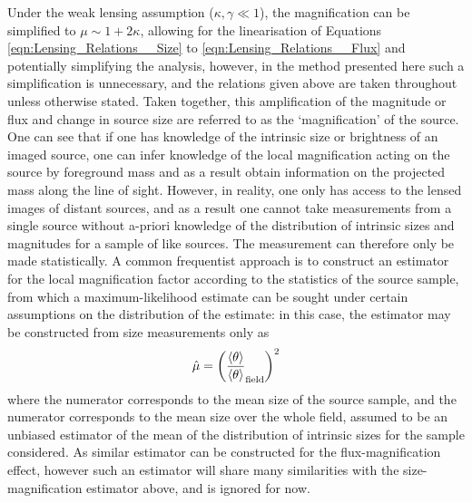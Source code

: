 \documentclass[useAMS,usenatbib,times,letter,amssymb]{mn2e}
\def\be{\begin{equation}}
\def\ee{\end{equation}}
\begin{document}
Under the weak lensing assumption ($\kappa, \gamma \ll 1$), the magnification can be simplified to $\mu \sim 1+2\kappa$, allowing for the linearisation of Equations \ref{eqn:Lensing_Relations__Size} to \ref{eqn:Lensing_Relations__Flux} and potentially simplifying the analysis, however, in the method presented here such a simplification is unnecessary, and the relations given above are taken throughout unless otherwise stated. Taken together, this amplification of the magnitude or flux and change in source size are referred to as the `magnification' of the source. One can see that if one has knowledge of the intrinsic size or brightness of an imaged source, one can infer knowledge of the local magnification acting on the source by foreground mass and as a result obtain information on the projected mass along the line of sight. However, in reality, one only has access to the lensed images of distant sources, and as a result one cannot take measurements from a single source without a-priori knowledge of the distribution of intrinsic sizes and magnitudes for a sample of like sources. The measurement can therefore only be made statistically. A common frequentist approach is to construct an estimator for the local magnification factor according to the statistics of the source sample, from which a maximum-likelihood estimate can be sought under certain assumptions on the distribution of the estimate: in this case, the estimator may be constructed from size measurements only as
\be
\hat{\mu} =  \left(\frac{\langle \theta \rangle}{\langle \theta \rangle}_{\rm field}\right)^2
\ee
where the numerator corresponds to the mean size of the source sample, and the numerator corresponds to the mean size over the whole field, assumed to be an unbiased estimator of the mean of the distribution of intrinsic sizes for the sample considered. As similar estimator can be constructed for the flux-magnification effect, however such an estimator will share many similarities with the size-magnification estimator above, and is ignored for now. 
\end{document}
